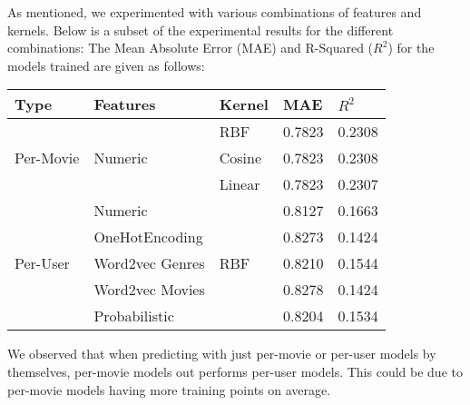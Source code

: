\documentclass[letterpaper]{article}
\begin{document}
As mentioned, we experimented with various combinations of features and kernels. Below is a subset of the experimental results for the different combinations:
The Mean Absolute Error (MAE) and R-Squared ($R^{2}$) for the models trained are given as follows:

\begin{center}
	\begin{tabular}{lllll}
		Type & Features & Kernel & MAE & $R^{2}$ \\
		\hline
		\multirow{3}{*}{Per-Movie} &\multirow{3}{*}{Numeric}
		 & RBF & 0.7823 & 0.2308\\
		& & Cosine & 0.7823 & 0.2308 \\
		& & Linear & 0.7823 & 0.2307 \\
		\hline
		\multirow{5}{*}{Per-User} & Numeric & \multirow{5}{*}{RBF} & 0.8127 & 0.1663 \\
		& OneHotEncoding & & 0.8273 & 0.1424 \\
		& Word2vec Genres & & 0.8210 & 0.1544 \\
		& Word2vec Movies & & 0.8278 & 0.1424 \\
		& Probabilistic   & & 0.8204 & 0.1534\\
	\end{tabular}
\end{center}
We observed that when predicting with just per-movie or per-user models by themselves, per-movie models out performs per-user models.
This could be due to per-movie models having more training points on average.
\end{document}

